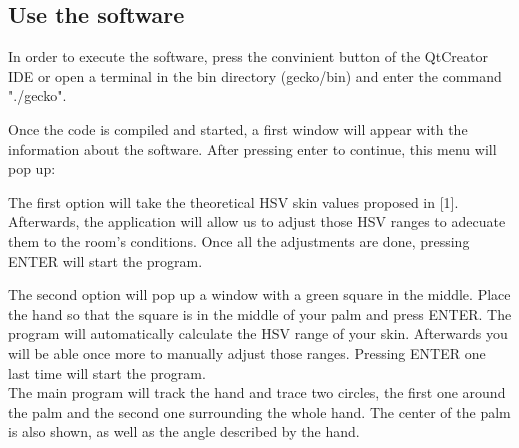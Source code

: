 \documentclass{article}
\begin{document}
\subsection{Use the software}
In order to execute the software, press the convinient button of the QtCreator IDE or open a terminal in the bin directory (gecko/bin) and enter the command "./gecko". 

Once the code is compiled and started, a first window will appear with the information about the software. After pressing enter to continue, this menu will pop up: 
\begin{center}
\end{center}

\vspace{1cm}
The first option will take the theoretical HSV skin values proposed in [1]. Afterwards, the application will allow us to adjust those HSV ranges to adecuate them to the room's conditions. 
Once all the adjustments are done, pressing ENTER will start the program. 

The second option will pop up a window with a green square in the middle. Place the hand so that the square is in the middle of your palm and press ENTER. The program will automatically calculate the HSV range of your skin. Afterwards you will be able once more to manually adjust those ranges. Pressing ENTER one last time will start the program. 
\\
 
The main program will track the hand and trace two circles, the first one around the palm and the second one surrounding the whole hand. The center of the palm is also shown, as well as the angle described by the hand. 
\end{document}
